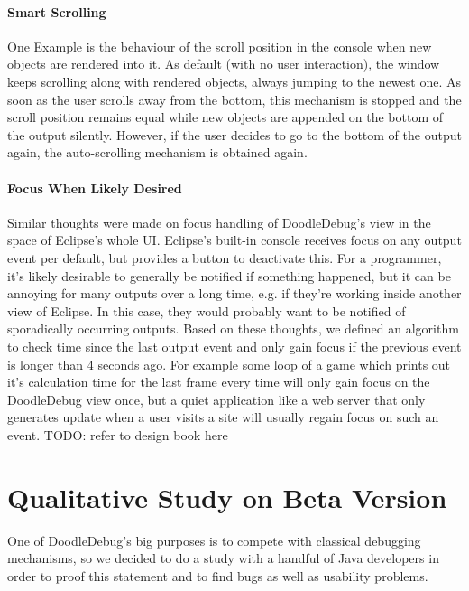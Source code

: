 \documentclass{report}
\begin{document}
\subsubsection*{Smart Scrolling}
One Example is the behaviour of the scroll position in the console when new objects are rendered into it. As default (with no user interaction), the window keeps scrolling along with rendered objects, always jumping to the newest one. As soon as the user scrolls away from the bottom, this mechanism is stopped and the scroll position remains equal while new objects are appended on the bottom of the output silently. However, if the user decides to go to the bottom of the output again, the auto-scrolling mechanism is obtained again.
\subsubsection*{Focus When Likely Desired}
Similar thoughts were made on focus handling of DoodleDebug's view in the space of Eclipse's whole UI. Eclipse's built-in console receives focus on any output event per default, but provides a button to deactivate this. For a programmer, it's likely desirable to generally be notified if something happened, but it can be annoying for many outputs over a long time, e.g. if they're working inside another view of Eclipse. In this case, they would probably want to be notified of sporadically occurring outputs. Based on these thoughts, we defined an algorithm to check time since the last output event and only gain focus if the previous event is longer than 4 seconds ago. For example some loop of a game which prints out it's calculation time for the last frame every time will only gain focus on the DoodleDebug view once, but a quiet application like a web server that only generates update when a user visits a site will usually regain focus on such an event.
TODO: refer to design book here

\chapter*{Qualitative Study on Beta Version}
One of DoodleDebug's big purposes is to compete with classical debugging mechanisms, so we decided to do a study with a handful of Java developers in order to proof this statement and to find bugs as well as usability problems.
\end{document}
